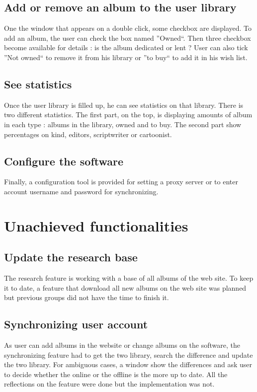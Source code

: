 \documentclass[11pt]{report} %
\begin{document}
\subsection{Add or remove an album to the user library}
One the window that appears on a double click, some checkbox are displayed. To add an album, the user can check the box named ''Owned``. Then three checkbox become available for details : is the album dedicated or lent ? User can also tick ''Not owned`` to remove it from his library or ''to buy`` to add it in his wish list.

\subsection{See statistics}
Once the user library is filled up, he can see statistics on that library. There is two different statistics. The first part, on the top, is displaying amounts of album in each type : albums in the library, owned and to buy. The second part show percentages on kind, editors, scriptwriter or cartoonist.

\subsection{Configure the software}
Finally, a configuration tool is provided for setting a proxy server or to enter account username and password for synchronizing.

\section{Unachieved functionalities}
\subsection{Update the research base}
The research feature is working with a base of all albums of the web site. To keep it to date, a feature that download all new albums on the web site was planned but previous groups did not have the time to finish it.

\subsection{Synchronizing user account}
As user can add albums in the website or change albums on the software, the synchronizing feature had to get the two library, search the difference and update the two library. For ambiguous cases, a window show the differences and ask user to decide whether the online or the offline is the more up to date. All the reflections on the feature were done but the implementation was not.
\end{document}
